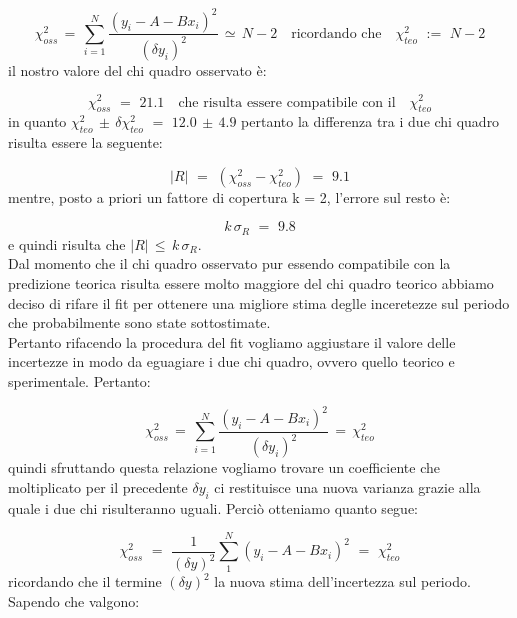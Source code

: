 \begin{equation*}
	\chi_{oss}^2 \,=\, \sum_{i=1}^{N} \frac{(y_i - A - Bx_i)^2}{(\delta y_i)^2} \,\simeq\, N - 2 \quad \text{ricordando che} \quad \chi_{teo}^2 \,\,:=\,\, N - 2
\end{equation*}
%
il nostro valore del chi quadro osservato è:

\begin{equation*}
	\chi_{oss}^2 \,\,=\,\, 21.1 \quad \text{che risulta essere compatibile con il} \quad \chi_{teo}^2
\end{equation*}
%
in quanto $\chi_{teo}^2 \, \pm \, \delta \chi_{teo}^2 \,\,=\,\, 12.0 \, \pm \, 4.9$ pertanto la differenza tra i due chi quadro risulta essere la seguente:

\begin{equation*}
	|R| \,\,=\,\, (\chi_{oss}^2 - \chi_{teo}^2) \,\,=\,\, 9.1
\end{equation*}
%
mentre, posto a priori un fattore di copertura k = 2, l'errore sul resto è:

\begin{equation*}
	k \, \sigma_{R} \,\,=\,\, 9.8
\end{equation*}
%
e quindi risulta che $|R| \, \leq \, k \, \sigma_{R}$.\\

Dal momento che il chi quadro osservato pur essendo compatibile con la predizione teorica risulta essere molto maggiore del chi quadro teorico abbiamo deciso di rifare il fit per ottenere una migliore stima deglle inceretezze sul periodo che probabilmente sono state sottostimate.\\
Pertanto rifacendo la procedura del fit vogliamo aggiustare il valore delle incertezze in modo da eguagiare i due chi quadro, ovvero quello teorico e sperimentale. Pertanto:

\begin{equation*}
	\chi_{oss}^2 \,=\, \sum_{i=1}^{N} \frac{(y_i - A - Bx_i)^2}{(\delta y_i)^2} \,=\, \chi_{teo}^2 
\end{equation*}
%
quindi sfruttando questa relazione vogliamo trovare un coefficiente che moltiplicato per il precedente $\delta y_i$ ci restituisce una nuova varianza grazie alla quale i due chi risulteranno uguali. Perciò otteniamo quanto segue:
	
\begin{equation*}
	\chi_{oss}^2 \,\,=\,\, \frac{1}{(\delta y)^2} \sum_{1}^{N} (y_i - A - Bx_i)^2  \,\,=\,\, \chi_{teo}^2
\end{equation*}
%
ricordando che il termine $(\delta y)^2$ la nuova stima dell'incertezza sul periodo. Sapendo che valgono:
	
